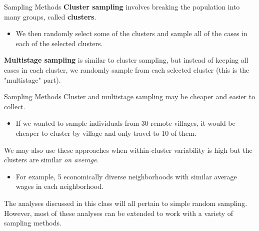 \begin{frame}{Sampling Methods}
    \textbf{Cluster sampling} involves breaking the population into many groups, called \textbf{clusters}. 
    \begin{itemize}
        \item We then randomly select some of the clusters and sample all of the cases in each of the selected clusters.
    \end{itemize}
    
    \vspace{18pt}
    \textbf{Multistage sampling} is similar to cluster sampling, but instead of keeping all cases in each cluster, we randomly sample from each selected cluster (this is the "multistage" part). 
\end{frame} 

\begin{frame}{Sampling Methods}
    Cluster and multistage sampling may be cheaper and easier to collect.
    \begin{itemize}
        \item If we wanted to sample individuals from 30 remote villages, it would be cheaper to cluster by village and only travel to 10 of them. 
    \end{itemize}
    We may also use these approaches when within-cluster variability is high but the clusters are similar \textit{on average}. 
    \begin{itemize}
        \item For example, 5 economically diverse neighborhoods with similar average wages in each neighborhood. 
    \end{itemize}
    
    \vspace{18pt}
    The analyses discussed in this class will all pertain to simple random sampling. However, most of these analyses can be extended to work with a variety of sampling methods. 
\end{frame}